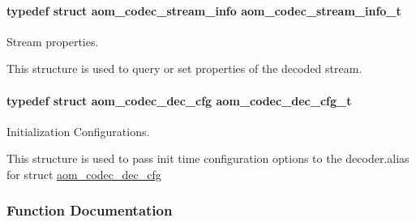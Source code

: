 \paragraph[{\texorpdfstring{aom\+\_\+codec\+\_\+stream\+\_\+info\+\_\+t}{aom_codec_stream_info_t}}]{\setlength{\rightskip}{0pt plus 5cm}typedef struct {\bf aom\+\_\+codec\+\_\+stream\+\_\+info}  {\bf aom\+\_\+codec\+\_\+stream\+\_\+info\+\_\+t}}\hypertarget{group__decoder_gab348c42a78bbbaa6488c84cdf3a28aaa}{}\label{group__decoder_gab348c42a78bbbaa6488c84cdf3a28aaa}


Stream properties. 

This structure is used to query or set properties of the decoded stream. 
\paragraph[{\texorpdfstring{aom\+\_\+codec\+\_\+dec\+\_\+cfg\+\_\+t}{aom_codec_dec_cfg_t}}]{\setlength{\rightskip}{0pt plus 5cm}typedef struct {\bf aom\+\_\+codec\+\_\+dec\+\_\+cfg}  {\bf aom\+\_\+codec\+\_\+dec\+\_\+cfg\+\_\+t}}\hypertarget{group__decoder_ga629c80380a9351796022345f655a5f3d}{}\label{group__decoder_ga629c80380a9351796022345f655a5f3d}


Initialization Configurations. 

This structure is used to pass init time configuration options to the decoder.\+alias for struct \hyperlink{structaom__codec__dec__cfg}{aom\+\_\+codec\+\_\+dec\+\_\+cfg} 

\subsubsection{Function Documentation}
